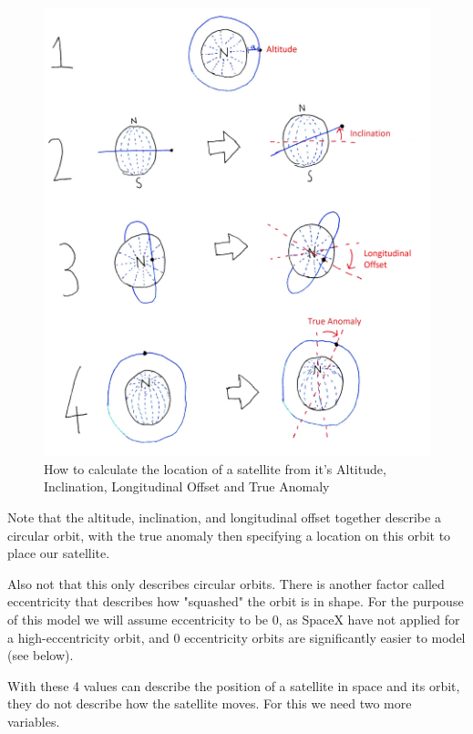 \documentclass[12pt,a4paper,twoside,openright]{report}
\begin{document}
\begin{figure}
	\caption{How to calculate the location of a satellite from it's Altitude, Inclination, Longitudinal Offset and True Anomaly}
	\label{Describing an orbit}
	\includegraphics[width=\textwidth]{DescribingAnOrbit}
\end{figure}

Note that the altitude, inclination, and longitudinal offset together describe a circular orbit, with the true anomaly then specifying a location on this orbit to place our satellite.

Also not that this only describes circular orbits. There is another factor called eccentricity that describes how "squashed" the orbit is in shape. For the purpouse of this model we will assume eccentricity to be 0, as SpaceX have not applied for a high-eccentricity orbit\cite{FCCApplication}, and 0 eccentricity orbits are significantly easier to model (see below).


With these 4 values can describe the position of a satellite in space and its orbit, they do not describe how the satellite moves. For this we need two more variables.
\end{document}
